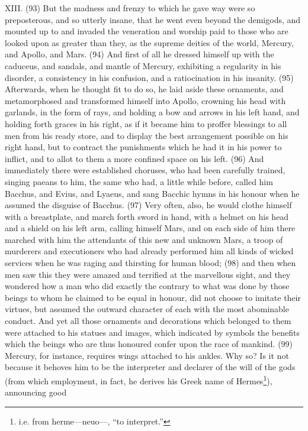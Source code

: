XIII. (93) But the madness and frenzy to which he gave way were so preposterous, and so utterly
insane, that he went even beyond the demigods, and mounted up to and invaded the veneration
and worship paid to those who are looked upon as greater than they, as the supreme deities of the
world, Mercury, and Apollo, and Mars. (94) And first of all he dressed himself up with the caduceus,
and sandals, and mantle of Mercury, exhibiting a regularity in his disorder, a consistency in his
confusion, and a ratiocination in his insanity. (95) Afterwards, when he thought fit to do so, he laid
aside these ornaments, and metamorphosed and transformed himself into Apollo, crowning his
head with garlands, in the form of rays, and holding a bow and arrows in his left hand, and holding
forth graces in his right, as if it became him to proffer blessings to all men from his ready store,
and to display the best arrangement possible on his right hand, but to contract the punishments
which he had it in his power to inflict, and to allot to them a more confined space on his left. (96)
And immediately there were established choruses, who had been carefully trained, singing paeans
to him, the same who had, a little while before, called him Bacchus, and Evius, and Lyaeus, and
sang Bacchic hymns in his honour when he assumed the disguise of Bacchus. (97) Very often,
also, he would clothe himself with a breastplate, and march forth sword in hand, with a helmet on
his head and a shield on his left arm, calling himself Mars, and on each side of him there marched
with him the attendants of this new and unknown Mars, a troop of murderers and executioners who
had already performed him all kinds of wicked services when he was raging and thirsting for human
blood; (98) and then when men saw this they were amazed and terrified at the marvellous sight,
and they wondered how a man who did exactly the contrary to what was done by those beings to
whom he claimed to be equal in honour, did not choose to imitate their virtues, but assumed the
outward character of each with the most abominable conduct. And yet all those ornaments and
decorations which belonged to them were attached to his statues and images, which indicated by
symbols the benefits which the beings who are thus honoured confer upon the race of mankind.
(99) Mercury, for instance, requires wings attached to his ankles. Why so? Is it not because it
behoves him to be the interpreter and declarer of the will of the gods (from which employment, in
fact, he derives his Greek name of Hermes\footnote{i.e. from herme—neuo—, ``to interpret.''}), announcing good

